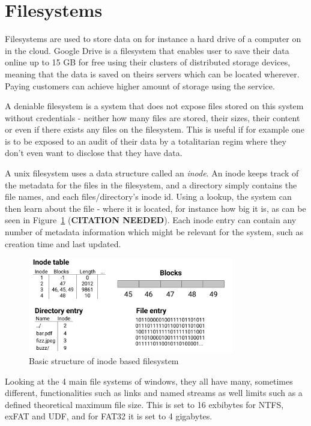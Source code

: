 \section{Filesystems}
Filesystems are used to store data on for instance a hard drive of a computer on in the cloud. Google Drive is a filesystem that enables user to save their data online up to 15 GB for free\cite{CloudStorageWork} using their clusters of distributed storage devices, meaning that the data is saved on theirs servers which can be located wherever\cite{DistributedStorageWhat}. Paying customers can achieve higher amount of storage using the service.

A deniable filesystem is a system that does not expose files stored on this system without credentials - neither how many files are stored, their sizes, their content or even if there exists any files on the filesystem\cite{petersDEFYDeniableFile2014}. This is useful if for example one is to be exposed to an audit of their data by a totalitarian regim where they don't even want to disclose that they have data.

A unix filesystem uses a data structure called an \textit{inode}. An inode keeps track of the metadata for the files in the filesystem, and a directory simply contains the file names, and each files/directory's inode id. Using a lookup, the system can then learn about the file - where it is located, for instance how big it is, as can be seen in Figure~\ref{fig:inode_diag} (\textbf{CITATION NEEDED}). Each inode entry can contain any number of metadata information which might be relevant for the system, such as creation time and last updated.

\begin{figure}[!ht]
	\begin{center}
	  \includegraphics[width=0.8\textwidth]{figures/inode_diagram.png}
	\end{center}
	\caption{Basic structure of inode based filesystem}
	\label{fig:inode_diag}
\end{figure}

Looking at the 4 main file systems of windows, they all have many, sometimes different, functionalities such as links and named streams\cite{mikbenFileSystemFunctionality} as well limits such as a defined theoretical maximum file size. This is set to 16 exbibytes for NTFS, exFAT and UDF, and for FAT32 it is set to 4 gigabytes. 